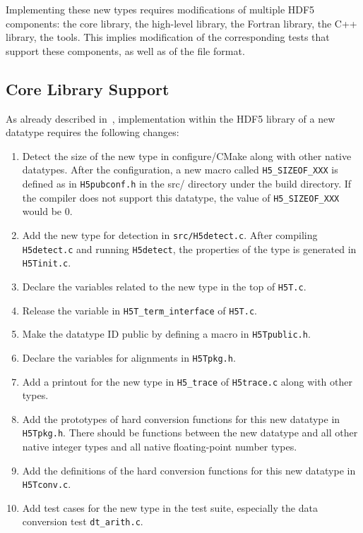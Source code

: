 \documentclass[letterpaper,hyper]{THG_RFC}
\begin{document}
Implementing these new types requires modifications of multiple HDF5 components:
the core library, the high-level library, the Fortran library, the C++ library,
the tools. This implies modification of the corresponding tests that support
these components, as well as of the file format.

\subsection{Core Library Support}
As already described in~\cite{lu2012}, implementation within the HDF5 library
of a new datatype requires the following changes:
\begin{enumerate}
\item Detect the size of the new type in configure/CMake along with other native datatypes. After the configuration, a new macro called \texttt{H5\_SIZEOF\_XXX}
is defined as in \texttt{H5pubconf.h} in the src/ directory under the build
directory. If the compiler does not support this datatype, the value of
\texttt{H5\_SIZEOF\_XXX} would be 0.
\item Add the new type for detection in \texttt{src/H5detect.c}. After compiling
\texttt{H5detect.c} and running \texttt{H5detect}, the properties of the type is
generated in \texttt{H5Tinit.c}. 
\item Declare the variables related to the new type in the top of \texttt{H5T.c}.
\item Release the variable in \texttt{H5T\_term\_interface} of \texttt{H5T.c}.
\item Make the datatype ID public by defining a macro in \texttt{H5Tpublic.h}.
\item Declare the variables for alignments in \texttt{H5Tpkg.h}.
\item Add a printout for the new type in \texttt{H5\_trace} of \texttt{H5trace.c}
along with other types.
\item Add the prototypes of hard conversion functions for this new datatype in
\texttt{H5Tpkg.h}. There should be functions between the new datatype and all
other native integer types and all native floating-point number types.
\item Add the definitions of the hard conversion functions for this new datatype
in \texttt{H5Tconv.c}.
\item Add test cases for the new type in the test suite, especially the data
conversion test \texttt{dt\_arith.c}.
\end{enumerate}
\end{document}
